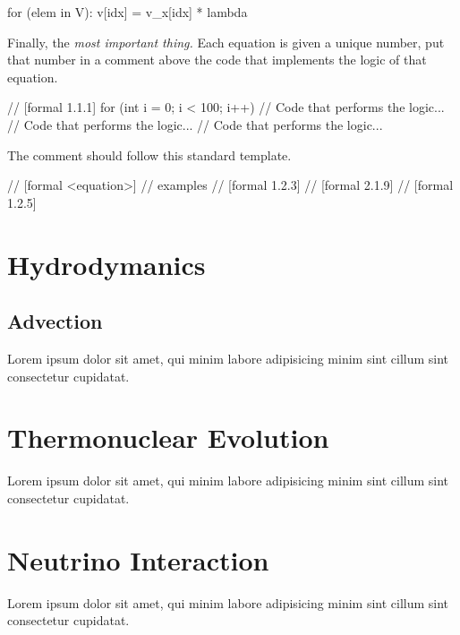 \begin{code}
for (elem in V):
  v[idx] = v_x[idx] * lambda
\end{code}

Finally, the \emph{most important thing.} Each equation is given a unique 
number, put that number in a comment above the code that implements the
logic of that equation.

\begin{code}
// [formal 1.1.1]
for (int i = 0; i < 100; i++) {
    // Code that performs the logic...
    // Code that performs the logic...
    // Code that performs the logic...
}
\end{code}

The comment should follow this standard template.

\begin{code}
// [formal <equation>]
// examples
// [formal 1.2.3]
// [formal 2.1.9]
// [formal 1.2.5]
\end{code}



\newpage
\section{Hydrodymanics}
\subsection{Advection}

Lorem ipsum dolor sit amet, qui minim labore adipisicing minim sint cillum sint
consectetur cupidatat.



\newpage
\section{Thermonuclear Evolution}

Lorem ipsum dolor sit amet, qui minim labore adipisicing minim sint cillum sint
consectetur cupidatat.

\newpage
\section{Neutrino Interaction}

Lorem ipsum dolor sit amet, qui minim labore adipisicing minim sint cillum sint
consectetur cupidatat.


\newpage
\printbibliography


